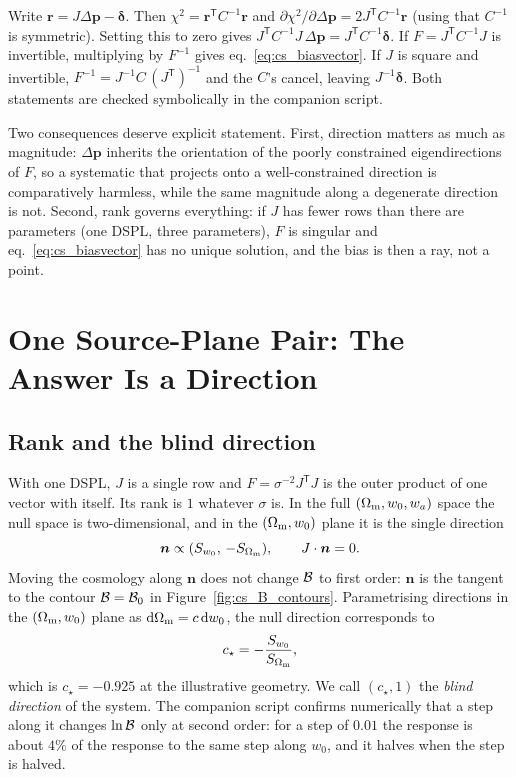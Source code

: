 \begin{derivation}
Write $\bm{r}=J\Delta\bm{p}-\bm{\delta}$. Then
$\chi^2=\bm{r}^{\mathsf T}C^{-1}\bm{r}$ and
$\partial\chi^2/\partial\Delta\bm{p}=2J^{\mathsf T}C^{-1}\bm{r}$ (using
that $C^{-1}$ is symmetric). Setting this to zero gives
$J^{\mathsf T}C^{-1}J\,\Delta\bm{p}=J^{\mathsf T}C^{-1}\bm{\delta}$.
If $F=J^{\mathsf T}C^{-1}J$ is invertible, multiplying by $F^{-1}$ gives
eq.~\eqref{eq:cs_biasvector}. If $J$ is square and invertible,
$F^{-1}=J^{-1}C\,(J^{\mathsf T})^{-1}$ and the $C$'s cancel, leaving
$J^{-1}\bm{\delta}$. Both statements are checked symbolically in the
companion script.
\end{derivation}

Two consequences deserve explicit statement. First, direction matters
as much as magnitude: $\Delta\bm{p}$ inherits the orientation of the
poorly constrained eigendirections of $F$, so a systematic that projects
onto a well-constrained direction is comparatively harmless, while the
same magnitude along a degenerate direction is not. Second, rank governs
everything: if $J$ has fewer rows than there are parameters (one DSPL,
three parameters), $F$ is singular and eq.~\eqref{eq:cs_biasvector} has
no unique solution, and the bias is then a ray, not a point.


\section{One Source-Plane Pair: The Answer Is a Direction}
\label{sec:cs_direction}

\subsection{Rank and the blind direction}

With one DSPL, $J$ is a single row and $F=\sigma^{-2}J^{\mathsf T}J$ is
the outer product of one vector with itself. Its rank is $1$ whatever
$\sigma$ is. In the full $(\Omega_{\mathrm{m}},w_0,w_a)$ space the null space is
two-dimensional, and in the $(\Omega_{\mathrm{m}},w_0)$ plane it is the single
direction
\begin{equation}
  \bm{n}\propto(S_{w_0},\,-S_{\Omega_{\mathrm{m}}}),
  \qquad J\cdot\bm{n}=0 .
  \label{eq:cs_null}
\end{equation}
Moving the cosmology along $\bm{n}$ does not change $\mathcal{B}$ to first
order: $\bm{n}$ is the tangent to the contour $\mathcal{B}=\mathcal{B}_0$ in
Figure~\ref{fig:cs_B_contours}. Parametrising directions in the
$(\Omega_{\mathrm{m}},w_0)$ plane as $\dd\Omega_{\mathrm{m}}=c\,\dd w_0$, the null direction
corresponds to
\begin{equation}
  c_\star=-\frac{S_{w_0}}{S_{\Omega_{\mathrm{m}}}} ,
  \label{eq:cs_cstar}
\end{equation}
which is $c_\star=-0.925$ at the illustrative geometry. We call
$(c_\star,1)$ the \emph{blind direction} of the system. The companion
script confirms numerically that a step along it changes $\ln\mathcal{B}$ only
at second order: for a step of $0.01$ the response is about $4\%$ of the
response to the same step along $w_0$, and it halves when the step is
halved.

